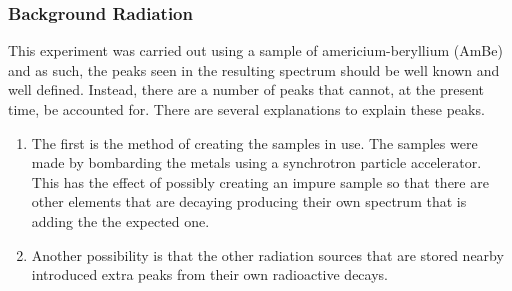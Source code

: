 \subsubsection{Background Radiation} %
\label{ssub:background_radiation}
This experiment was carried out using a sample of americium-beryllium (AmBe) and as such, the peaks seen in the resulting spectrum should be well known and well defined. Instead, there are a number of peaks that cannot, at the present time, be accounted for. There are several explanations to explain these peaks. 
\begin{enumerate}
	\item The first is the method of creating the samples in use. The samples were made by bombarding the metals using a synchrotron particle accelerator. This has the effect of possibly creating an impure sample so that there are other elements that are decaying producing their own spectrum that is adding the the expected one.
	\item Another possibility is that the other radiation sources that are stored nearby introduced extra peaks from their own radioactive decays.
\end{enumerate}

